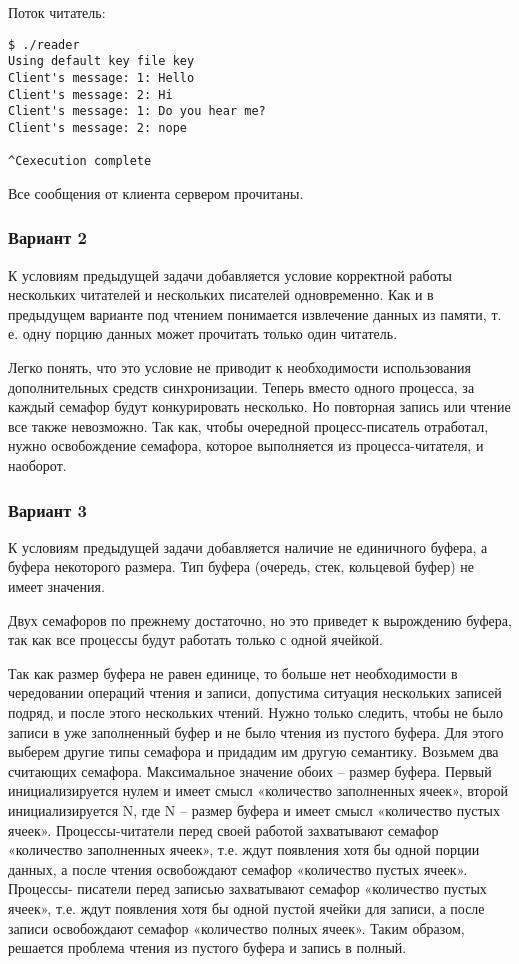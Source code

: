 \documentclass[a4paper]{article}
\begin{document}
	Поток читатель:
	\begin{lstlisting}[style=crs_bash]
$ ./reader 
Using default key file key
Client's message: 1: Hello
Client's message: 2: Hi
Client's message: 1: Do you hear me?
Client's message: 2: nope

^Cexecution complete
	\end{lstlisting}
	
	Все сообщения от клиента сервером прочитаны.
	
	\subsubsection{Вариант 2}
	К условиям предыдущей задачи добавляется условие корректной работы нескольких читателей и нескольких писателей одновременно. Как и в предыдущем варианте под чтением понимается извлечение данных из памяти, т. е. одну порцию данных может прочитать только один читатель.

	Легко понять, что это условие не приводит к необходимости использования дополнительных средств синхронизации. Теперь вместо одного процесса, за каждый семафор будут конкурировать несколько. Но повторная запись или чтение все также невозможно. Так как, чтобы очередной процесс-писатель отработал, нужно освобождение семафора, которое выполняется из процесса-читателя, и наоборот.
	
	\subsubsection{Вариант 3}	
	К условиям предыдущей задачи добавляется наличие не единичного буфера, а буфера некоторого размера. Тип буфера (очередь, стек, кольцевой буфер) не имеет значения.
	
	Двух семафоров по прежнему достаточно, но это приведет к вырождению буфера, так как все процессы будут работать только с одной ячейкой.
	
	Так как размер буфера не равен единице, то больше нет необходимости в чередовании операций чтения и записи, допустима ситуация нескольких записей подряд, и после этого нескольких чтений. Нужно только следить, чтобы не было записи в уже заполненный буфер и не было чтения из пустого буфера. Для этого выберем другие типы семафора и придадим им другую семантику. Возьмем два считающих семафора. Максимальное значение обоих – размер буфера. Первый инициализируется нулем и имеет смысл «количество заполненных ячеек», второй инициализируется N, где N – размер буфера и имеет смысл «количество пустых ячеек». Процессы-читатели перед своей работой захватывают семафор «количество заполненных ячеек», т.е. ждут появления хотя бы одной порции данных, а после чтения освобождают семафор «количество пустых ячеек». Процессы- писатели перед записью захватывают семафор «количество пустых ячеек», т.е. ждут появления хотя бы одной пустой ячейки для записи, а после записи освобождают семафор «количество полных ячеек». Таким образом, решается проблема чтения из пустого буфера и запись в полный.
	
\end{document}

